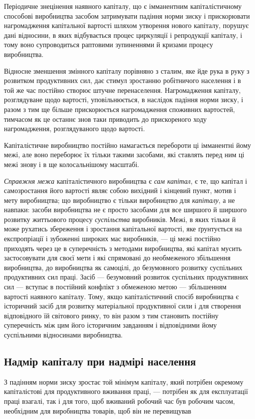 
Періодичне знецінення наявного капіталу, що є імманентним
капіталістичному способові виробництва засобом затримувати
падіння норми зиску і прискорювати нагромадження капітальної
вартості шляхом утворення нового капіталу, порушує дані відносини,
в яких відбувається процес циркуляції і репродукції
капіталу, і тому воно супроводиться раптовими зупиненнями й
кризами процесу виробництва.

Відносне зменшення змінного капіталу порівняно з сталим,
яке йде рука в руку з розвитком продуктивних сил, дає стимул
зростанню робітничого населення і в той же час постійно створює
штучне перенаселення. Нагромадження капіталу, розглядуване
щодо вартості, уповільнюється, в наслідок падіння норми зиску, і
разом з тим ще більше прискорюється нагромадження споживних
вартостей, тимчасом як це останнє знов таки приводить до прискореного
ходу нагромадження, розглядуваного щодо вартості.

Капіталістичне виробництво постійно намагається перебороти
ці імманентні йому межі, але воно переборює їх тільки такими
засобами, які ставлять перед ним ці межі знову і в ще колосальнішому
масштабі.

\emph{Справжня межа} капіталістичного виробництва є \emph{сам капітал},
є те, що капітал і самозростання його вартості являє собою
вихідний і кінцевий пункт, мотив і мету виробництва; що виробництво
є тільки виробництво для \emph{капіталу}, а не навпаки:
засоби виробництва не є просто засобами для все ширшого й
ширшого розвитку життьового процесу \emph{суспільства} виробників.
Межі, в яких тільки й може рухатись збереження і зростання
капітальної вартості, яке ґрунтується на експропріації і зубоженні
широких мас виробників, — ці межі постійно приходять
через це в суперечність з методами виробництва, які капітал
мусить застосовувати для своєї мети і які спрямовані до необмеженого
збільшення виробництва, до виробництва як самоцілі, до безумовного
розвитку суспільних продуктивних сил праці. Засіб —
безумовний розвиток суспільних продуктивних сил — вступає
в постійний конфлікт з обмеженою метою — збільшенням вартості
наявного капіталу. Тому, якщо капіталістичний спосіб виробництва
є історичний засіб для розвитку матеріальної продуктивної
сили і для створення відповідного їй світового ринку, то
він разом з тим становить постійну суперечність між цим його
історичним завданням і відповідними йому суспільними відносинами
виробництва.

\subsection{Надмір капіталу при надмірі населення}

З падінням норми зиску зростає той мінімум капіталу, який
потрібен окремому капіталістові для продуктивного вживання
праці, — потрібен як для експлуатації праці взагалі, так і для
того, щоб вживаний робочий час був робочим часом, необхідним
для виробництва товарів, щоб він не перевищував
\parbreak{}  %
